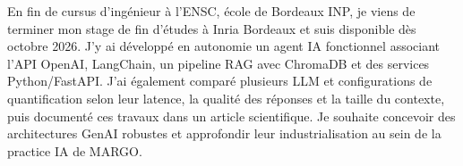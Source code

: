 
\begin{cvparagraph}
En fin de cursus d’ingénieur à l’ENSC, école de Bordeaux INP, je viens de terminer mon stage de fin d’études à Inria Bordeaux et suis disponible dès octobre 2026. J’y ai développé en autonomie un agent IA fonctionnel associant l’API OpenAI, LangChain, un pipeline RAG avec ChromaDB et des services Python/FastAPI. J’ai également comparé plusieurs LLM et configurations de quantification selon leur latence, la qualité des réponses et la taille du contexte, puis documenté ces travaux dans un article scientifique. Je souhaite concevoir des architectures GenAI robustes et approfondir leur industrialisation au sein de la practice IA de MARGO.
\end{cvparagraph}
